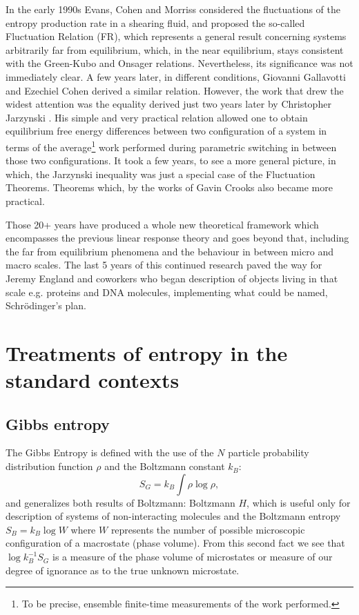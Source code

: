 \documentclass[a4paper,12pt]{article}
\begin{document}
In the early 1990s Evans, Cohen and Morriss \cite{Evans:1993bl} considered the fluctuations of the entropy production rate in a shearing fluid, and proposed the so-called Fluctuation Relation (FR), which represents a general result concerning systems arbitrarily far from equilibrium, which, in the near equilibrium,  stays consistent with the Green-Kubo and Onsager relations. Nevertheless, its significance was not immediately clear.
A few years later, in different conditions, Giovanni Gallavotti and Ezechiel Cohen \cite{Gallavotti:1995gy} derived a similar relation. However, the work that drew the widest attention was the equality derived just two years later by Christopher Jarzynski \cite{Jarzynski:1997uj}. 
His simple and very practical relation allowed one to obtain equilibrium free energy differences between two configuration of a system in terms of the average\footnote{To be precise, ensemble finite-time measurements of the work performed.} work performed during parametric switching in between those two configurations.
It took a few years, to see a more general picture, in which, the Jarzynski inequality was just a special case of the Fluctuation Theorems. Theorems which, by the works of Gavin Crooks \cite{Crooks:2008ta} also became more practical. 

Those 20+ years have produced a whole new theoretical framework which encompasses the previous linear response theory and goes beyond that, including the far from equilibrium phenomena and the behaviour in between micro and macro scales. 
The last 5 years of this continued research paved the way for Jeremy England and coworkers \cite{England:2015hl, England:2010fb} who began description of objects living in that scale e.g. proteins and DNA molecules, implementing what could be named, Schrödinger's plan. 

\section{Treatments of entropy in the standard contexts}

\subsection{Gibbs entropy}
\label{Gibbs entropy}
The Gibbs Entropy is defined with the use of the $N$ particle probability distribution function $ \rho $ and the Boltzmann constant $k_B$:
\begin{equation}
  S_G = k_B \int \rho \log{\rho},
\end{equation}
and generalizes both results of Boltzmann:
Boltzmann $H$, which is useful only for description of systems of non-interacting molecules \cite{Jaynes:1965gg} and the Boltzmann entropy $S_B = k_B \log{W}$ where $W$ represents the number of possible microscopic configuration of a macrostate (phase volume). 
From this second fact we see that $\log{k_B^{-1} S_G}$ is a measure of the phase volume of microstates or measure of our degree of ignorance as to the true unknown microstate.
\end{document}
